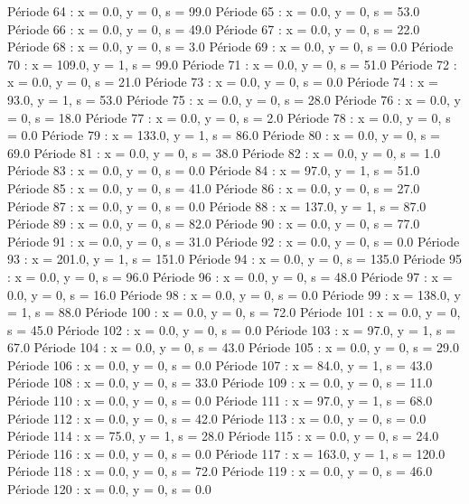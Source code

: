 Période 64 : x = 0.0, y = 0, s = 99.0
Période 65 : x = 0.0, y = 0, s = 53.0
Période 66 : x = 0.0, y = 0, s = 49.0
Période 67 : x = 0.0, y = 0, s = 22.0
Période 68 : x = 0.0, y = 0, s = 3.0
Période 69 : x = 0.0, y = 0, s = 0.0
Période 70 : x = 109.0, y = 1, s = 99.0
Période 71 : x = 0.0, y = 0, s = 51.0
Période 72 : x = 0.0, y = 0, s = 21.0
Période 73 : x = 0.0, y = 0, s = 0.0
Période 74 : x = 93.0, y = 1, s = 53.0
Période 75 : x = 0.0, y = 0, s = 28.0
Période 76 : x = 0.0, y = 0, s = 18.0
Période 77 : x = 0.0, y = 0, s = 2.0
Période 78 : x = 0.0, y = 0, s = 0.0
Période 79 : x = 133.0, y = 1, s = 86.0
Période 80 : x = 0.0, y = 0, s = 69.0
Période 81 : x = 0.0, y = 0, s = 38.0
Période 82 : x = 0.0, y = 0, s = 1.0
Période 83 : x = 0.0, y = 0, s = 0.0
Période 84 : x = 97.0, y = 1, s = 51.0
Période 85 : x = 0.0, y = 0, s = 41.0
Période 86 : x = 0.0, y = 0, s = 27.0
Période 87 : x = 0.0, y = 0, s = 0.0
Période 88 : x = 137.0, y = 1, s = 87.0
Période 89 : x = 0.0, y = 0, s = 82.0
Période 90 : x = 0.0, y = 0, s = 77.0
Période 91 : x = 0.0, y = 0, s = 31.0
Période 92 : x = 0.0, y = 0, s = 0.0
Période 93 : x = 201.0, y = 1, s = 151.0
Période 94 : x = 0.0, y = 0, s = 135.0
Période 95 : x = 0.0, y = 0, s = 96.0
Période 96 : x = 0.0, y = 0, s = 48.0
Période 97 : x = 0.0, y = 0, s = 16.0
Période 98 : x = 0.0, y = 0, s = 0.0
Période 99 : x = 138.0, y = 1, s = 88.0
Période 100 : x = 0.0, y = 0, s = 72.0
Période 101 : x = 0.0, y = 0, s = 45.0
Période 102 : x = 0.0, y = 0, s = 0.0
Période 103 : x = 97.0, y = 1, s = 67.0
Période 104 : x = 0.0, y = 0, s = 43.0
Période 105 : x = 0.0, y = 0, s = 29.0
Période 106 : x = 0.0, y = 0, s = 0.0
Période 107 : x = 84.0, y = 1, s = 43.0
Période 108 : x = 0.0, y = 0, s = 33.0
Période 109 : x = 0.0, y = 0, s = 11.0
Période 110 : x = 0.0, y = 0, s = 0.0
Période 111 : x = 97.0, y = 1, s = 68.0
Période 112 : x = 0.0, y = 0, s = 42.0
Période 113 : x = 0.0, y = 0, s = 0.0
Période 114 : x = 75.0, y = 1, s = 28.0
Période 115 : x = 0.0, y = 0, s = 24.0
Période 116 : x = 0.0, y = 0, s = 0.0
Période 117 : x = 163.0, y = 1, s = 120.0
Période 118 : x = 0.0, y = 0, s = 72.0
Période 119 : x = 0.0, y = 0, s = 46.0
Période 120 : x = 0.0, y = 0, s = 0.0



